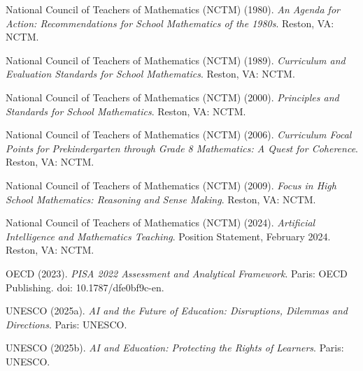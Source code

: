 National Council of Teachers of Mathematics (NCTM) (1980).
\emph{An Agenda for Action: Recommendations for School Mathematics of the
1980s}. Reston, VA: NCTM.

National Council of Teachers of Mathematics (NCTM) (1989).
\emph{Curriculum and Evaluation Standards for School Mathematics}.
Reston, VA: NCTM.

National Council of Teachers of Mathematics (NCTM) (2000).
\emph{Principles and Standards for School Mathematics}.
Reston, VA: NCTM.

National Council of Teachers of Mathematics (NCTM) (2006).
\emph{Curriculum Focal Points for Prekindergarten through Grade 8
Mathematics: A Quest for Coherence}.
Reston, VA: NCTM.

National Council of Teachers of Mathematics (NCTM) (2009).
\emph{Focus in High School Mathematics: Reasoning and Sense Making}.
Reston, VA: NCTM.

National Council of Teachers of Mathematics (NCTM) (2024).
\emph{Artificial Intelligence and Mathematics Teaching}.
Position Statement, February 2024. Reston, VA: NCTM.

OECD (2023).
\emph{PISA 2022 Assessment and Analytical Framework}.
Paris: OECD Publishing.
doi: 10.1787/dfe0bf9c-en.

UNESCO (2025a).
\emph{AI and the Future of Education: Disruptions, Dilemmas and Directions}.
Paris: UNESCO.

UNESCO (2025b).
\emph{AI and Education: Protecting the Rights of Learners}.
Paris: UNESCO.

\endgroup

\endgroup
